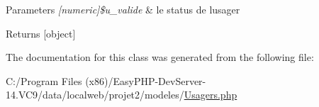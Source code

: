 \begin{DoxyParams}{Parameters}
{\em \mbox{[}numeric\mbox{]}\$u\+\_\+valide} & le status de l\textquotesingle{}usager \\
\hline
\end{DoxyParams}
\begin{DoxyReturn}{Returns}
\mbox{[}object\mbox{]} 
\end{DoxyReturn}


The documentation for this class was generated from the following file\+:\begin{DoxyCompactItemize}
\item 
C\+:/\+Program Files (x86)/\+Easy\+P\+H\+P-\/\+Dev\+Server-\/14.\+V\+C9/data/localweb/projet2/modeles/\hyperlink{_usagers_8php}{Usagers.\+php}\end{DoxyCompactItemize}
